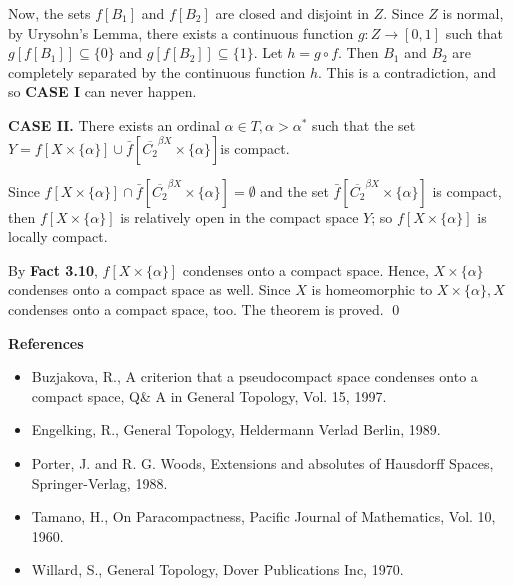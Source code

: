 \documentclass{article}
\begin{document}
\vskip 25pt

Now, the sets $f\left[B_1\right]$ and $f\left[B_2\right]$ are closed and disjoint in $Z$. Since $Z$ is normal, by Urysohn's Lemma, there exists a continuous function $g:Z\rightarrow [0,1]$ such that $g\left[ f\left[B_1\right]\right]\subseteq \{0\}$ and $g\left[f\left[B_2\right]\right]\subseteq \{1\}.$ Let $h=g\circ f.$ Then $B_1$ and $B_2$ are completely separated by the continuous function $h$. This is a contradiction, and so \textbf{CASE I} can never happen.  















\vskip 30pt

\textbf{CASE II.} There exists an ordinal $\alpha \in T, \alpha>\alpha^*$ such that the set $Y=f\left[X\times\{\alpha\}\right] \cup \bar{f}\left[\overline{C_2}^{\beta X} \times \{\alpha\}\right] $is compact. 

\vskip 10pt

Since $f\left[X\times\{\alpha\}\right] \cap \bar{f}\left[\overline{C_2}^{\beta X} \times \{\alpha\}\right]=\emptyset$ and the set 
$\bar{f}\left[\overline{C_2}^{\beta X} \times \{\alpha\}\right]$ is compact, then $f\left[X\times \{\alpha\}\right]$ is relatively open in the compact space $Y$; so  $f\left[X\times\{\alpha\}\right]$ is locally compact.
\vskip 10pt

By \textbf{Fact 3.10}, $f\left[X\times\{\alpha\}\right]$ condenses onto a compact space. Hence, $X\times\{\alpha\}$ condenses onto a compact space as well. Since $X$ is homeomorphic to $X\times \{\alpha\}, X$ condenses onto a compact space, too. The theorem is proved. \qed
 


\newpage


\begin{center}
\textbf{References}
\end{center}

\vskip 30pt

\begin{itemize}
	\item Buzjakova, R., A criterion that a pseudocompact space condenses onto a compact space, Q\& A in General Topology, Vol. 15, 1997.
	\item Engelking, R., General Topology, Heldermann Verlad Berlin, 1989.
	\item Porter, J. and R. G. Woods, Extensions and absolutes of Hausdorff Spaces, Springer-Verlag, 1988.
	\item Tamano, H., On Paracompactness, Pacific Journal of Mathematics, Vol. 10, 1960. 
	\item Willard, S., General Topology, Dover Publications Inc, 1970.
\end{itemize}
\end{document}
